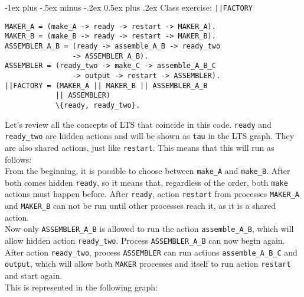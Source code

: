 \documentclass[10pt,landscape]{article}
\makeatletter
\renewcommand{\section}{\@startsection{section}{1}{0mm}%
                                {-1ex plus -.5ex minus -.2ex}%
                                {0.5ex plus .2ex}%
                                {\normalfont\large\bfseries}}
\makeatother
\begin{document}
\begin{multicols}{3}
\section{Class exercise: \texttt{||FACTORY}}
\begin{verbatim}
MAKER_A = (make_A -> ready -> restart -> MAKER_A).
MAKER_B = (make_B -> ready -> restart -> MAKER_B).
ASSEMBLER_A_B = (ready -> assemble_A_B -> ready_two
                -> ASSEMBLER_A_B).
ASSEMBLER = (ready_two -> make_C -> assemble_A_B_C
                -> output -> restart -> ASSEMBLER).
||FACTORY = (MAKER_A || MAKER_B || ASSEMBLER_A_B 
            || ASSEMBLER)
            \{ready, ready_two}.
\end{verbatim}
Let's review all the concepts of LTS that coincide in this code. \texttt{ready} and \texttt{ready\_two} are hidden actions and will be shown as \texttt{tau} in the LTS graph. They are also shared actions, just like \texttt{restart}. This means that this will run as follows: \\
From the beginning, it is possible to choose between \texttt{make\_A} and \texttt{make\_B}. After both comes hidden \texttt{ready}, so it means that, regardless of the order, both \texttt{make} actions must happen before. After \texttt{ready}, action \texttt{restart} from processes \texttt{MAKER\_A} and \texttt{MAKER\_B} can not be run until other processes reach it, as it is a shared action. \\
Now only \texttt{ASSEMBLER\_A\_B} is allowed to run the action \texttt{assemble\_A\_B}, which will allow hidden action \texttt{ready\_two}. Process \texttt{ASSEMBLER\_A\_B} can now begin again. \\
After action \texttt{ready\_two}, process \texttt{ASSEMBLER} can run actions \texttt{assemble\_A\_B\_C} and \texttt{output}, which will allow both \texttt{MAKER} processes and itself to run action \texttt{restart} and start again.\\
This is represented in the following graph:
\begin{center}
\end{center}
\end{multicols}
\end{document}
